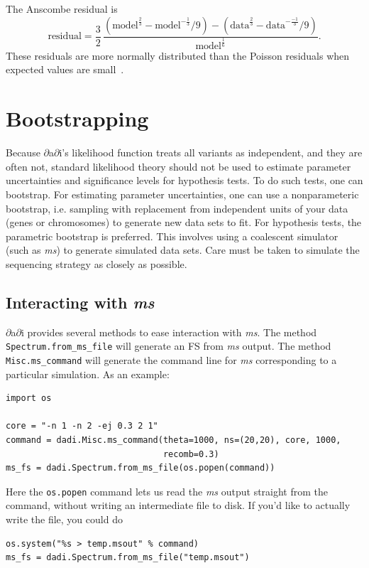 \documentclass[12pt]{article}
\makeatletter
\newcommand{\dadi}{$\partial$a$\partial$i\xspace}
\newcommand{\ms}{\emph{ms}\xspace}
\newcommand{\py}[1]{\lstinline[language=Python, showstringspaces=False]@#1@}
\makeatother
\begin{document}
The Anscombe residual is
\begin{equation}
\text{residual} = \frac{3}{2} \, \frac{(\text{model}^\frac{2}{3} - \text{model}^{-\frac{1}{3}}/9) - (\text{data}^\frac{2}{3} - \text{data}^{-\frac{-1}{3}}/9)}{\text{model}^\frac{1}{6}}.
\end{equation}
These residuals are more normally distributed than the Poisson residuals when expected values are small~\cite{bib:Pierce1986}.

\section{Bootstrapping}

Because \dadi's likelihood function treats all variants as independent, and they are often not, standard likelihood theory should not be used to estimate parameter uncertainties and significance levels for hypothesis tests.
To do such tests, one can bootstrap.
For estimating parameter uncertainties, one can use a nonparameteric bootstrap, i.e. sampling with replacement from independent units of your data (genes or chromosomes) to generate new data sets to fit.
For hypothesis tests, the parametric bootstrap is preferred.
This involves using a coalescent simulator (such as \ms) to generate simulated data sets.
Care must be taken to simulate the sequencing strategy as closely as possible.

\subsection{Interacting with \ms}

\dadi provides several methods to ease interaction with \ms.
The method \py{Spectrum.from_ms_file} will generate an FS from \ms output.
The method \py{Misc.ms_command} will generate the command line for \ms corresponding to a particular simulation.
As an example:
\begin{lstlisting}
import os

core = "-n 1 -n 2 -ej 0.3 2 1"
command = dadi.Misc.ms_command(theta=1000, ns=(20,20), core, 1000,
                               recomb=0.3)
ms_fs = dadi.Spectrum.from_ms_file(os.popen(command))
\end{lstlisting}
Here the \py{os.popen} command lets us read the \ms output straight from the command, without writing an intermediate file to disk.
If you'd like to actually write the file, you could do
\begin{lstlisting}
os.system("%s > temp.msout" % command)
ms_fs = dadi.Spectrum.from_ms_file("temp.msout")
\end{lstlisting}
\end{document}
